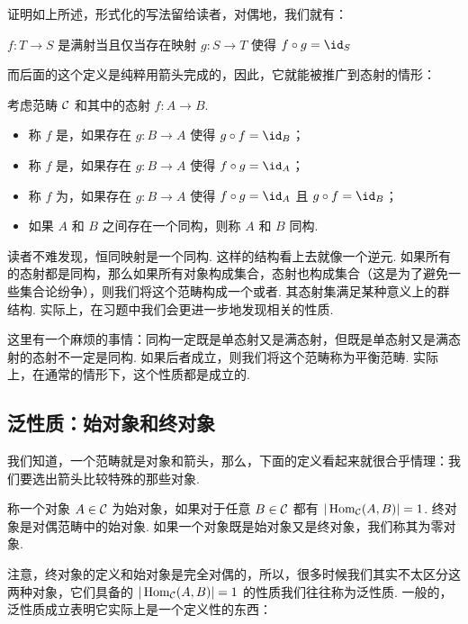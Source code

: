 证明如上所述，形式化的写法留给读者，对偶地，我们就有：

\begin{lemma}{}{}
    $f: T \to S$ 是满射当且仅当存在映射 $g: S \to T$ 使得 $f \circ g = \id_S$
\end{lemma}

而后面的这个定义是纯粹用箭头完成的，因此，它就能被推广到态射的情形：

\begin{definition}{}{}
    考虑范畴 $\mathcal{C}$ 和其中的态射 $f: A \to B$.
    \begin{itemize}
        \item 称 $f$ 是，如果存在 $g: B \to A$ 使得 $g \circ f = \id_B$；
        \item 称 $f$ 是，如果存在 $g: B \to A$ 使得 $f \circ g = \id_A$；
        \item 称 $f$ 为，如果存在 $g: B \to A$ 使得 $f \circ g = \id_A$ 且 $g \circ f = \id_B$；
        \item 如果 $A$ 和 $B$ 之间存在一个同构，则称 $A$ 和 $B$ 同构.
    \end{itemize}
\end{definition}

读者不难发现，恒同映射是一个同构. 这样的结构看上去就像一个逆元. 如果所有的态射都是同构，那么如果所有对象构成集合，态射也构成集合（这是为了避免一些集合论纷争），则我们将这个范畴构成一个或者. 其态射集满足某种意义上的群结构. 实际上，在习题中我们会更进一步地发现相关的性质.

这里有一个麻烦的事情：同构一定既是单态射又是满态射，但既是单态射又是满态射的态射不一定是同构. 如果后者成立，则我们将这个范畴称为平衡范畴. 实际上，在通常的情形下，这个性质都是成立的.

\subsection{泛性质：始对象和终对象}

我们知道，一个范畴就是对象和箭头，那么，下面的定义看起来就很合乎情理：我们要选出箭头比较特殊的那些对象.

\begin{definition}{}{}
    称一个对象 $A \in \mathcal{C}$ 为始对象，如果对于任意 $B \in \mathcal{C}$ 都有 $|\mathop\mathrm{Hom}_{\mathcal{C}} (A, B)| = 1$. 终对象是对偶范畴中的始对象. 如果一个对象既是始对象又是终对象，我们称其为零对象.
\end{definition}

注意，终对象的定义和始对象是完全对偶的，所以，很多时候我们其实不太区分这两种对象，它们具备的 $|\mathop\mathrm{Hom}_{\mathcal{C}} (A, B)| = 1$ 的性质我们往往称为泛性质. 一般的，泛性质成立表明它实际上是一个定义性的东西：

